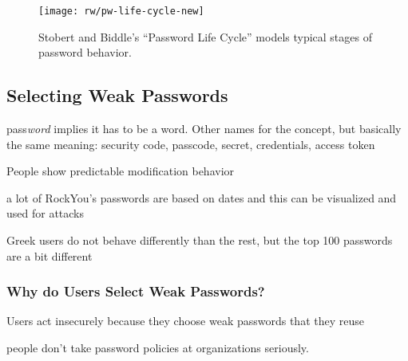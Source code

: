 \begin{figure}[!htbp]
	\centering
	\texttt{[image: rw/pw-life-cycle-new]}
	\caption{\label{fig:rw:pw_life_cycle} Stobert and Biddle's ``Password Life Cycle'' \cite{Stobert2014PasswordLifeCycle} models typical stages of password behavior.}
\end{figure}




	\subsection{Selecting Weak Passwords}

	pass\textit{word} implies it has to be a word. Other names for the concept, but basically the same meaning: security code, passcode, secret, credentials, access token
	
	\cite{Jakobsson2013BenefitsUnderstandingPWs}
	
	People show predictable modification behavior \cite{Gaw2005ReuseRecycle}
	
	
	a lot of RockYou's passwords are based on dates and this can be visualized and used for attacks \cite{Veras2012VisualizingSemanticsPasswords}
	
	Greek users do not behave differently than the rest, but the top 100 passwords are a bit different \cite{Violettas2014PasswordsAvoidGreece}
	
	
	\cite{Li2017PersonalInformation}

	\subsubsection{Why do Users Select Weak Passwords?}
	
	Users act insecurely because they choose weak passwords that they reuse \cite{Riley2006WhatUsersKnowWhatTheyDo}
	
	people don't take password policies at organizations seriously.  \cite{Weirich2005PersuasivePasswordSecurity}
	
